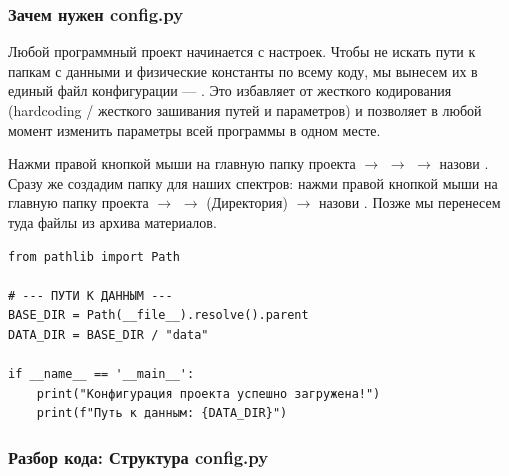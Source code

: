 \subsubsection{Зачем нужен config.py}
Любой программный проект начинается с настроек. Чтобы не искать пути к папкам с данными и физические константы по всему коду, мы вынесем их в единый файл конфигурации — . Это избавляет от жесткого кодирования (hardcoding / жесткого зашивания путей и параметров) и позволяет в любой момент изменить параметры всей программы в одном месте.

Нажми правой кнопкой мыши на главную папку проекта $\rightarrow$  $\rightarrow$  $\rightarrow$ назови .
Сразу же создадим папку для наших спектров: нажми правой кнопкой мыши на главную папку проекта $\rightarrow$  $\rightarrow$  (Директория) $\rightarrow$ назови . Позже мы перенесем туда файлы из архива материалов.

\begin{listing}[H]
	\caption{Конфигурационный модуль config.py}
	\label{lst:config_code}
	\begin{verbatim}
from pathlib import Path

# --- ПУТИ К ДАННЫМ ---
BASE_DIR = Path(__file__).resolve().parent
DATA_DIR = BASE_DIR / "data"

if __name__ == '__main__':
    print("Конфигурация проекта успешно загружена!")
    print(f"Путь к данным: {DATA_DIR}")
	\end{verbatim}
\end{listing}



\subsubsection{Разбор кода: Структура config.py}

